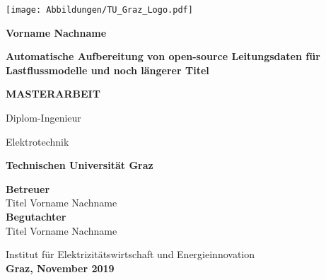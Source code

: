 %
%
%
%

\pagestyle{empty} \enlargethispage*{23cm}
	
\vspace*{-1.5cm}
\begin{center}
	\hspace*{-1.1cm}
	\texttt{[image: Abbildungen/TU\_Graz\_Logo.pdf]}
			
	\vspace*{1.5cm}
	
	{\normalsize \textbf{Vorname Nachname\\}}
	

	\vspace*{1.5cm} \LARGE\textbf{Automatische Aufbereitung von open-source Leitungsdaten für Lastflussmodelle und noch längerer Titel}\vspace*{1cm} \vfill
	
	
	\large{\textbf{MASTERARBEIT\\}}

	\vspace*{1cm}{\normalsize zur Erlangung des akademischen Grades\\}
	{\normalsize {}Diplom-Ingenieur\\}

	{\normalsize {}Elektrotechnik\\}

	\vspace*{1cm}{\normalsize eingereicht an der\\}
	\large{\textbf{Technischen Universität Graz\\}}
	
	\vspace*{1.5cm}\large{\textbf{Betreuer\\}}
	{\normalsize {}Titel Vorname Nachname\\}
	\large{\textbf{Begutachter\\}} %
	{\normalsize Titel Vorname Nachname\\} %
	
	\vspace*{0.7cm}
	\normalsize Institut für Elektrizitätswirtschaft und Energieinnovation\\
	
	\vspace*{1.5cm}\small{\textbf{Graz, November 2019\\}} \vspace*{.7cm}
	
\end{center}

\clearpage 